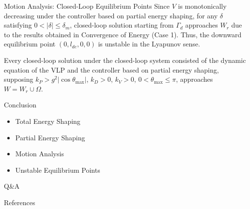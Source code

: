 \documentclass[10pt]{beamer}
\begin{document}
  \begin{frame}{Motion Analysis: Closed-Loop Equilibrium Points}
    Since $V$ is
    monotonically decreasing under the controller
    based on partial energy shaping, for any $\delta$
    satisfying $0 < |\delta| \le \delta_m$, closed-loop solution
    starting from $\Gamma_d$
    approaches $W_r$ due to the results obtained in
    Convergence of Energy (Case 1).
    Thus, the downward
    equilibrium point $(0, l_{de}, 0, 0)$ is unstable in the
    Lyapunov sense.

    Every closed-loop solution under the closed-loop
    system consisted of the dynamic equation of the VLP and the controller
    based on partial energy shaping, supposing
    $k_P>g^2|\cos\theta_{\max}|$, $k_D>0$, $k_V>0$,
    $0<\theta_{\max}\le\pi$, approaches $W=W_r\cup\Omega$.
  \end{frame}

  \begin{frame}{Conclusion}
    \begin{itemize}
      \item Total Energy Shaping
      \item Partial Energy Shaping
      \item Motion Analysis
      \item Unstable Equilibrium Points
    \end{itemize}
  \end{frame}

  \begin{frame}[standout]
    Q\&A
  \end{frame}

  \appendix

  \begin{frame}{References}
    
    
  \end{frame}
\end{document}
